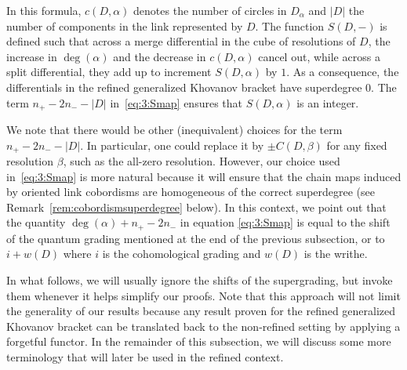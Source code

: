 \documentclass[12pt]{amsart}
\theoremstyle{definition}
\theoremstyle{plain}
\begin{document}
In this formula, $c(D,\alpha)$ denotes the number of circles in $D_\alpha$
and $|D|$ the number of components in the link represented by $D$.
The function $S(D,-)$ is defined such that across a merge differential in the cube of resolutions of $D$,
the increase in $\deg(\alpha)$ and the decrease in $c(D,\alpha)$ cancel out, while across
a split differential, they add up to increment $S(D,\alpha)$ by $1$.
As a consequence, the differentials in the refined generalized Khovanov bracket have
superdegree $0$.
The term
$n_+-2n_--|D|$ in~\eqref{eq:3:Smap} ensures that $S(D,\alpha)$ is an integer.

We note that there would be other (inequivalent) choices for the term $n_+-2n_--|D|$.
In particular, one could replace it by $\pm C(D,\beta)$ for any fixed resolution $\beta$,
such as the all-zero resolution.
However, our choice used in~\eqref{eq:3:Smap} is more natural because it will ensure
that the chain maps induced by oriented link cobordisms are homogeneous
of the correct superdegree (see Remark~\ref{rem:cobordismsuperdegree} below).
In this context, we point out that
the quantity $\deg(\alpha)+n_+ - 2n_-$ in equation \eqref{eq:3:Smap} is equal to the
shift of the quantum grading mentioned at the end of the previous subsection, or to
$i+w(D)$ where $i$ is the cohomological grading and $w(D)$ is the writhe.

In what follows, we 
will usually ignore the shifts of the supergrading, but invoke them whenever
it helps simplify our proofs.
Note that this approach will not limit the generality of our results because
any result proven for the refined generalized Khovanov bracket can be
translated back to the non-refined setting by applying a forgetful functor.
In the remainder of this subsection, we will discuss some more terminology
that will later be used in the refined context.
\end{document}
